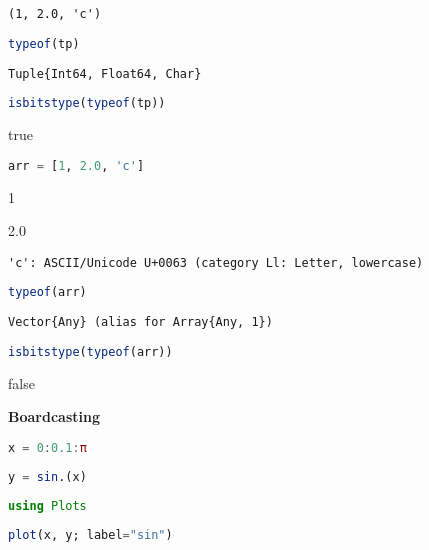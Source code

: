 \documentclass[
  notoc %
]{tufte-book}
\begin{document}
\begin{lstlisting}[language=Output]
(1, 2.0, 'c')
\end{lstlisting}

\begin{lstlisting}[language=Julia]
typeof(tp)
\end{lstlisting}

\begin{lstlisting}[language=Output]
Tuple{Int64, Float64, Char}
\end{lstlisting}

\begin{lstlisting}[language=Julia]
isbitstype(typeof(tp))
\end{lstlisting}

true

\begin{lstlisting}[language=Julia]
arr = [1, 2.0, 'c']
\end{lstlisting}

1

2.0

\begin{lstlisting}[language=Output]
'c': ASCII/Unicode U+0063 (category Ll: Letter, lowercase)
\end{lstlisting}

\begin{lstlisting}[language=Julia]
typeof(arr)
\end{lstlisting}

\begin{lstlisting}[language=Output]
Vector{Any} (alias for Array{Any, 1})
\end{lstlisting}

\begin{lstlisting}[language=Julia]
isbitstype(typeof(arr))
\end{lstlisting}

false

\textbf{Boardcasting}

\begin{lstlisting}[language=Julia]
x = 0:0.1:π
\end{lstlisting}

\begin{lstlisting}[language=Julia]
y = sin.(x)
\end{lstlisting}

\begin{lstlisting}[language=Julia]
using Plots
\end{lstlisting}

\begin{lstlisting}[language=Julia]
plot(x, y; label="sin")
\end{lstlisting}
\end{document}
